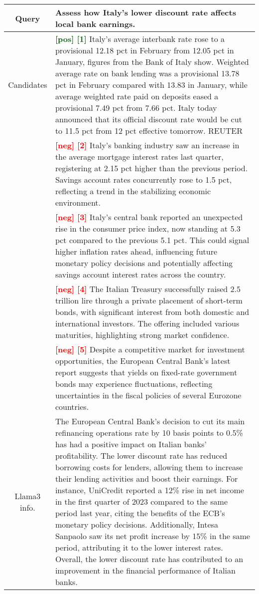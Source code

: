 \begin{table*}[ht]
    \centering
    \small
    \begin{tabularx}{\textwidth}{c|X} %
        \toprule
        Query & Assess how Italy's lower discount rate affects local bank earnings. \\ \midrule
        Candidates & \textbf{\textcolor{darkgreen}{[pos] [1]}} Italy's average interbank rate rose to a provisional 12.18 pct in February from 12.05 pct in January, figures from the Bank of Italy show. Weighted average rate on bank lending was a provisional 13.78 pct in February compared with 13.83 in January, while average weighted rate paid on deposits eased a provisional 7.49 pct from 7.66 pct. Italy today announced that its official discount rate would be cut to 11.5 pct from 12 pct effective tomorrow. REUTER \\ 
        & \textbf{\textcolor{red}{[neg] [2]}} Italy's banking industry saw an increase in the average mortgage interest rates last quarter, registering at 2.15 pct higher than the previous period. Savings account rates concurrently rose to 1.5 pct, reflecting a trend in the stabilizing economic environment. \\ 
        & \textbf{\textcolor{red}{[neg] [3]}} Italy's central bank reported an unexpected rise in the consumer price index, now standing at 5.3 pct compared to the previous 5.1 pct. This could signal higher inflation rates ahead, influencing future monetary policy decisions and potentially affecting savings account interest rates across the country. \\ 
        & \textbf{\textcolor{red}{[neg] [4]}} The Italian Treasury successfully raised 2.5 trillion lire through a private placement of short-term bonds, with significant interest from both domestic and international investors. The offering included various maturities, highlighting strong market confidence. \\
        & \textbf{\textcolor{red}{[neg] [5]}} Despite a competitive market for investment opportunities, the European Central Bank's latest report suggests that yields on fixed-rate government bonds may experience fluctuations, reflecting uncertainties in the fiscal policies of several Eurozone countries. \\ \midrule \midrule
        Llama3 info. & The European Central Bank's decision to cut its main refinancing operations rate by 10 basis points to 0.5\% has had a positive impact on Italian banks' profitability. The lower discount rate has reduced borrowing costs for lenders, allowing them to increase their lending activities and boost their earnings. For instance, UniCredit reported a 12\% rise in net income in the first quarter of 2023 compared to the same period last year, citing the benefits of the ECB's monetary policy decisions. Additionally, Intesa Sanpaolo saw its net profit increase by 15\% in the same period, attributing it to the lower interest rates. Overall, the lower discount rate has contributed to an improvement in the financial performance of Italian banks. \\ \midrule

\end{tabularx}
\end{table*}
